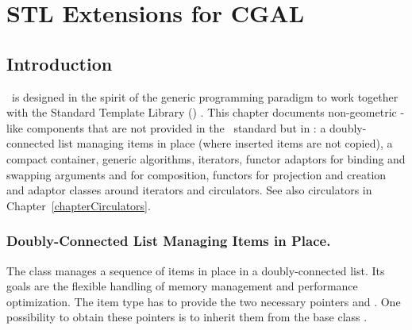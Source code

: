 
\chapter{STL Extensions for CGAL}
\label{chapterDataStructures}\label{chapterStlExtensions}



\section*{Introduction}

\cgal\ is designed in the spirit of the generic programming paradigm
to work together with the Standard Template Library (\stl)
\cite{cgal:ansi-is14882-98,cgal:a-gps-98}. This chapter documents non-geometric
\stl-like components that are not provided in the \stl\ standard but
in \cgal: a doubly-connected list managing items in place (where
inserted items are not copied), a compact container, generic algorithms,
iterators, functor
adaptors for binding and swapping arguments and for composition,
functors for projection and creation and adaptor classes around
iterators and circulators. See also circulators in
Chapter~\ref{chapterCirculators}.

\subsection*{Doubly-Connected List Managing Items in Place.}

The class  manages a
sequence of items in place in a doubly-connected list. Its goals are
the flexible handling of memory management and performance
optimization. The item type has to provide the two necessary
pointers  and . One possibility
to obtain these pointers is to inherit them from the base class
.

